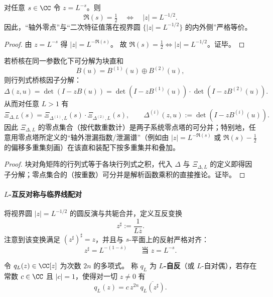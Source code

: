 \begin{corollary}\label{cor:xi-critical-line-horizon-circle}
对任意 \(s\in\CC\) 令 \(z=L^{-s}\)。则
\[
\Re(s)=\tfrac12\quad\Longleftrightarrow\quad |z|=L^{-1/2}.
\]
因此，“轴外零点”与“二次特征值落在视界圆 \(\{ |z|=L^{-1/2}\}\) 的内外侧”严格等价。
\end{corollary}

\begin{proof}
由 \(z=L^{-s}\) 得 \(|z|=L^{-\Re(s)}\)。
故 \(\Re(s)=\tfrac12\iff |z|=L^{-1/2}\)。证毕。
\end{proof}

\begin{corollary}\label{cor:xi-leakage-additivity-directsum}
若桥核在同一参数化下可分解为块直和
\[
B(u)=B^{(1)}(u)\oplus B^{(2)}(u),
\]
则行列式桥核因子分解：
\[
\Delta(z,u)=\det(I-zB(u))=\det(I-zB^{(1)}(u))\cdot \det(I-zB^{(2)}(u)).
\]
从而对任意 \(L>1\) 有
\[
\Xi_{\Delta,L}(s)=\Xi_{\Delta^{(1)},L}(s)\cdot \Xi_{\Delta^{(2)},L}(s),
\qquad
\Delta^{(i)}(z,u):=\det(I-zB^{(i)}(u)).
\]
因此 \(\Xi_{\Delta,L}\) 的零点集合（按代数重数计）是两子系统零点塔的可分并；特别地，任意用零点塔所定义的“轴外泄漏指数/泄漏谱”（例如由 \(|z|=L^{-\Re(s)}\) 或 \(\Re(s)-\tfrac12\) 的偏移多重集刻画）在该直和装配下按多重集并和叠加。
\end{corollary}
\begin{proof}
块对角矩阵的行列式等于各块行列式之积，代入 \(\Delta\) 与 \(\Xi_{\Delta,L}\) 的定义即得因子分解；零点集合的（按重数）可分并是解析函数乘积的直接推论。证毕。
\end{proof}

\paragraph{\texorpdfstring{$L$}{L}-互反对称与临界线配对}
将视界圆 \(|z|=L^{-1/2}\) 的圆反演与共轭合并，定义互反变换
\begin{equation}\label{eq:xi-z-sharp}
z^\sharp:=\frac{1}{L\overline{z}}.
\end{equation}
注意到该变换满足 \((z^\sharp)^\sharp=z\)，并且与 \(s\)-平面上的反射严格对齐：
\begin{equation}\label{eq:xi-z-sharp-s-map}
z^\sharp=L^{-(1-\overline{s})}\qquad\text{当 }z=L^{-s}.
\end{equation}

\begin{definition}\label{def:xi-L-self-reciprocal}
令 \(q_L(z)\in\CC[z]\) 为次数 \(2n\) 的多项式。
称 \(q_L\) 为 \textbf{\(L\)-自反}（或 \(L\)-自对偶），若存在常数 \(c\in\CC\) 且 \(|c|=1\)，使得对一切 \(z\neq 0\) 有
\begin{equation}\label{eq:xi-L-self-reciprocal}
q_L(z)=c\,z^{2n}\,\overline{q_L(z^\sharp)}.
\end{equation}
\end{definition}


